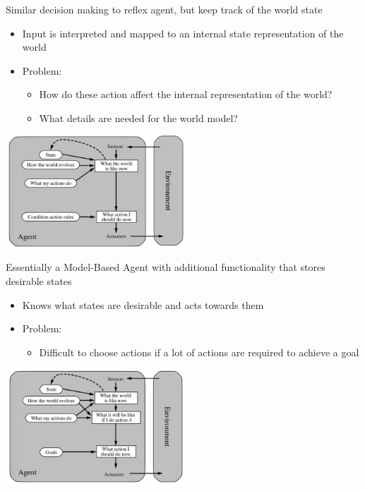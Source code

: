 \documentclass[
../../EiKI_Summary.tex,
]
{subfiles}
\begin{document}
\begin{defbox}
    Similar decision making to reflex agent, but keep track of the world state 
    \begin{itemize}
        \item Input is interpreted and mapped to an internal state representation of the world
        \item Problem: 
        \begin{itemize}
            \item How do these action affect the internal representation of the world?
            \item What details are needed for the world model?
        \end{itemize}
    \end{itemize}

    \begin{center}
        \includegraphics[width=0.5\textwidth]{Pics/02/ModelBasedAgent.png}
    \end{center}
\end{defbox}

\begin{defbox}
    Essentially a Model-Based Agent with additional functionality that stores desirable states
    \begin{itemize}
        \item Knows what states are desirable and acts towards them
        \item Problem:
        \begin{itemize}
            \item Difficult to choose actions if a lot of actions are required to achieve a goal
        \end{itemize}
    \end{itemize}

    \begin{center}
        \includegraphics[width=0.5\textwidth]{Pics/02/GoalBasedAgent.png}
    \end{center}
\end{defbox}
\end{document}
